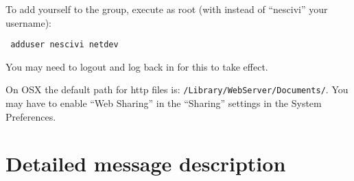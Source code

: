 \documentclass[letterpaper,10pt]{article}
\begin{document}
To add yourself to the group, execute as root (with instead of ``nescivi'' your username):
\begin{verbatim}
 adduser nescivi netdev
\end{verbatim}

You may need to logout and log back in for this to take effect.

On OSX the default path for http files is: \verb|/Library/WebServer/Documents/|. You may have to enable ``Web Sharing'' in the ``Sharing'' settings in the System Preferences.



\section{Detailed message description}
\end{document}
